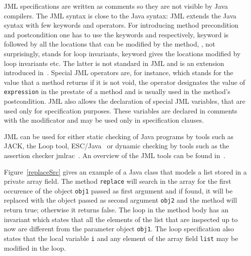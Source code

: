 JML specifications are written as comments so they are not visible by Java compilers. The JML syntax is close to the 
 Java syntax: JML extends the Java  syntax with few keywords and operators.
 For introducing method precondition and postcondition one has to use the keywords  and  
  respectively,   keyword is followed by all the locations that can be modified by the method, 
  , not surprisingly, stands for loop invariants,  keyword gives the locations modified by loop invariants etc. 
  The latter is not standard in JML and is an extension introduced in~\cite{BRL-JACK}. Special JML operators are, for instance,  which stands for the value that a method returns if it is not void, the  operator 
  designates the value of \texttt{expression} in the prestate of a method and is usually
 used in the method's postcondition. JML also allows the declaration of special JML variables, that are used only for specification purposes. 
These variables are declared in comments with the  modificator and may be used only in specification clauses. 

JML can be used for either static checking of Java programs by tools such as JACK, the Loop tool, 
ESC/Java~\cite{escjava} or dynamic checking by tools such as the assertion checker jmlrac~\cite{jmlrac}. An overview of the JML tools can 
be found in~\cite{BurdyCCEKLLP03}.
     
Figure~\ref{replaceSrc} gives an example of a Java class that models a list stored in a private array field. 
The method \texttt{replace} will search in the array for the first occurence of the object \texttt{obj1} passed as first argument and if found, it will be replaced with the object passed as second argument \texttt{obj2} and the method will return true; otherwise it returns false. The loop in the method body has an invariant which states that all the elements of the list that are inspected up to now are different from the parameter object \texttt{obj1}. The loop specification also states
that the local variable \texttt{i} and any element of the array field \texttt{list} may be modified in the loop.

